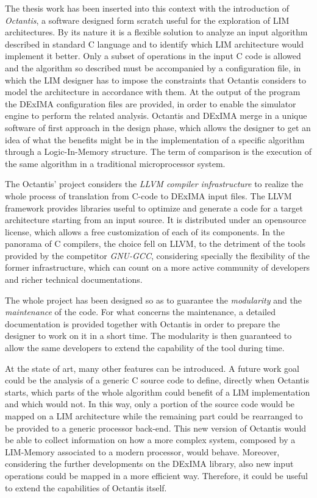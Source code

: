 The thesis work has been inserted into this context with the introduction of {\itshape Octantis}, a software designed form scratch useful for the exploration of L\+IM architectures. By its nature it is a flexible solution to analyze an input algorithm described in standard C language and to identify which L\+IM architecture would implement it better. Only a subset of operations in the input C code is allowed and the algorithm so described must be accompanied by a configuration file, in which the L\+IM designer has to impose the constraints that Octantis considers to model the architecture in accordance with them. At the output of the program the D\+Ex\+I\+MA configuration files are provided, in order to enable the simulator engine to perform the related analysis. Octantis and D\+Ex\+I\+MA merge in a unique software of first approach in the design phase, which allows the designer to get an idea of what the benefits might be in the implementation of a specific algorithm through a Logic-\/\+In-\/\+Memory structure. The term of comparison is the execution of the same algorithm in a traditional microprocessor system.

The Octantis’ project considers the {\itshape L\+L\+VM compiler infrastructure} to realize the whole process of translation from C-\/code to D\+Ex\+I\+MA input files. The L\+L\+VM framework provides libraries useful to optimize and generate a code for a target architecture starting from an input source. It is distributed under an opensource license, which allows a free customization of each of its components. In the panorama of C compilers, the choice fell on L\+L\+VM, to the detriment of the tools provided by the competitor {\itshape G\+N\+U-\/\+G\+CC}, considering specially the flexibility of the former infrastructure, which can count on a more active community of developers and richer technical documentations.



The whole project has been designed so as to guarantee the {\itshape modularity} and the {\itshape maintenance} of the code. For what concerns the maintenance, a detailed documentation is provided together with Octantis in order to prepare the designer to work on it in a short time. The modularity is then guaranteed to allow the same developers to extend the capability of the tool during time.

At the state of art, many other features can be introduced. A future work goal could be the analysis of a generic C source code to define, directly when Octantis starts, which parts of the whole algorithm could benefit of a L\+IM implementation and which would not. In this way, only a portion of the source code would be mapped on a L\+IM architecture while the remaining part could be rearranged to be provided to a generic processor back-\/end. This new version of Octantis would be able to collect information on how a more complex system, composed by a L\+I\+M-\/\+Memory associated to a modern processor, would behave. Moreover, considering the further developments on the D\+Ex\+I\+MA library, also new input operations could be mapped in a more efficient way. Therefore, it could be useful to extend the capabilities of Octantis itself.

